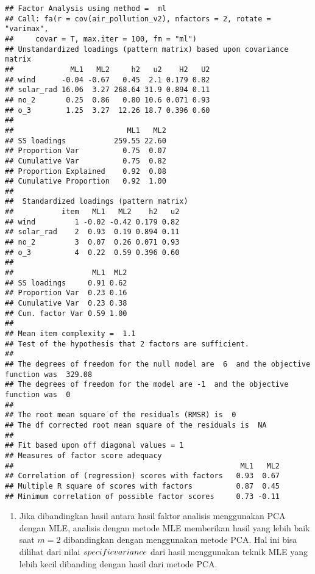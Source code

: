 \documentclass[
]{article}
\providecommand{\tightlist}{%
  \setlength{\itemsep}{0pt}\setlength{\parskip}{0pt}}
\begin{document}
\begin{verbatim}
## Factor Analysis using method =  ml
## Call: fa(r = cov(air_pollution_v2), nfactors = 2, rotate = "varimax", 
##     covar = T, max.iter = 100, fm = "ml")
## Unstandardized loadings (pattern matrix) based upon covariance matrix
##             ML1   ML2     h2   u2    H2   U2
## wind      -0.04 -0.67   0.45  2.1 0.179 0.82
## solar_rad 16.06  3.27 268.64 31.9 0.894 0.11
## no_2       0.25  0.86   0.80 10.6 0.071 0.93
## o_3        1.25  3.27  12.26 18.7 0.396 0.60
## 
##                          ML1   ML2
## SS loadings           259.55 22.60
## Proportion Var          0.75  0.07
## Cumulative Var          0.75  0.82
## Proportion Explained    0.92  0.08
## Cumulative Proportion   0.92  1.00
## 
##  Standardized loadings (pattern matrix)
##           item   ML1   ML2    h2   u2
## wind         1 -0.02 -0.42 0.179 0.82
## solar_rad    2  0.93  0.19 0.894 0.11
## no_2         3  0.07  0.26 0.071 0.93
## o_3          4  0.22  0.59 0.396 0.60
## 
##                  ML1  ML2
## SS loadings     0.91 0.62
## Proportion Var  0.23 0.16
## Cumulative Var  0.23 0.38
## Cum. factor Var 0.59 1.00
## 
## Mean item complexity =  1.1
## Test of the hypothesis that 2 factors are sufficient.
## 
## The degrees of freedom for the null model are  6  and the objective function was  329.08
## The degrees of freedom for the model are -1  and the objective function was  0 
## 
## The root mean square of the residuals (RMSR) is  0 
## The df corrected root mean square of the residuals is  NA 
## 
## Fit based upon off diagonal values = 1
## Measures of factor score adequacy             
##                                                    ML1   ML2
## Correlation of (regression) scores with factors   0.93  0.67
## Multiple R square of scores with factors          0.87  0.45
## Minimum correlation of possible factor scores     0.73 -0.11
\end{verbatim}

\begin{enumerate}
\def\labelenumi{\alph{enumi}.}
\setcounter{enumi}{2}
\tightlist
\item
  Jika dibandingkan hasil antara hasil faktor analisis menggunakan PCA
  dengan MLE, analisis dengan metode MLE memberikan hasil yang lebih
  baik saat \(m = 2\) dibandingkan dengan menggunakan metode PCA. Hal
  ini bisa dilihat dari nilai \(specific \space variance\) dari hasil
  menggunakan teknik MLE yang lebih kecil dibanding dengan hasil dari
  metode PCA.
\end{enumerate}
\end{document}
